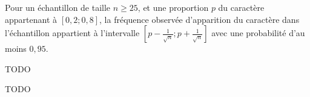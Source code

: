 \begin{propriete}
  Pour un échantillon de taille $n\geq25$, et une proportion $p$ du
  caractère appartenant à $[0,2;0,8]$, la fréquence observée d'apparition du caractère dans l'échantillon appartient à l'intervalle $\left[p-\frac{1}{\sqrt{n}};p+\frac{1}{\sqrt{n}}\right]$ avec une probabilité d'au moins $0,95$.
\end{propriete}

\begin{exemple}
  TODO
\end{exemple}

\begin{exemple}
  TODO
\end{exemple}
